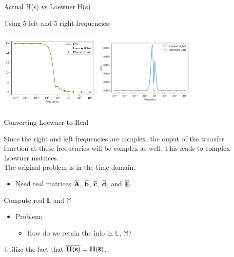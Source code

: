 \begin{frame}{Actual H(s) vs Loewner H(s)}

Using 5 left and 5 right frequencies:

\centering
\includegraphics[width=5cm, height= 4cm]{loewner2.png}
\bigskip
\includegraphics[width=5cm, height=4cm]{loewner1.png}

\end{frame}
\begin{frame}{Converting Loewner to Real}

Since the right and left frequencies are complex, the ouput of the transfer function at these frequencies will be complex as well. This leads to complex Loewner matrices.\\
\bigskip
The original problem is in the time domain.\\
\bigskip
\begin{itemize}
    \item <1-> Need real matrices $\bf \widehat A$, $\bf \widehat b$, $\bf \widehat c$, $\bf \widehat d$, and $\bf \widehat E$\\
\end{itemize}
\bigskip
Compute real $\mathbb{L}$ and $\mathbb{M}$
\bigskip
\begin{itemize}
    \item <1-> Problem:
    \begin{itemize}
        \item How do we retain the info in $\mathbb{L}$, $\mathbb{M}$?
    \end{itemize}
\end{itemize}
\bigskip
Utilize the fact that $\overline{\bf{H}(s)} = \bf{H}(\overline{s})$.

\end{frame}

